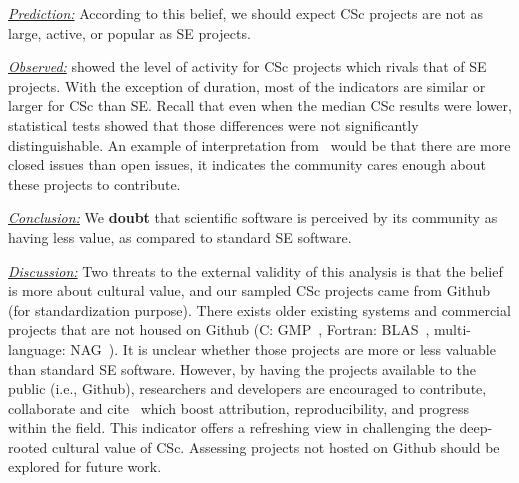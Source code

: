 \documentclass[conference,10pt]{IEEEtran}
\newenvironment{RQ}{\vspace{1mm}\begin{tcolorbox}[enhanced,width=3.4in,size=fbox,colback=red!5!white,drop shadow southeast,sharp corners]}{\end{tcolorbox}}
\begin{document}
\noindent \textit{\underline{Prediction:}} 
According to this belief, we should expect CSc projects are not as large, active, or popular as SE projects.

\noindent \textit{\underline{Observed:}} 
 showed the
level of activity for CSc projects which rivals that of SE projects.
With the exception of duration, most of the indicators are similar or larger for CSc than SE. Recall that even when the median CSc results were lower, statistical tests showed that those differences were not significantly distinguishable. 
An example of interpretation from~ would be that there are more closed issues than open issues, it indicates the community cares enough about these projects to contribute.

\begin{RQ}
\textit{\underline{Conclusion:}} 
We \textbf{doubt} that scientific software is perceived by its community as having less value, as compared to standard SE software.
\end{RQ}

\noindent \textit{\underline{Discussion:}}
Two threats to the external validity of this analysis is that the belief is more about cultural value,
and our sampled CSc projects came from Github (for standardization purpose). There exists older existing systems and commercial projects that are not housed on Github (C: GMP~\cite{gmp}, Fortran: BLAS~\cite{blas}, multi-language: NAG~\cite{nag}). It is unclear whether those projects are more or less valuable than standard SE software. However, by having 
the projects available to the public (i.e., Github), researchers and developers are encouraged to contribute, collaborate and cite~\cite{Borges_github, borges_github_star} which boost attribution,  reproducibility, and progress within the field. This indicator offers a refreshing view in challenging the deep-rooted cultural value of CSc. Assessing projects not hosted on Github should be explored for future work. \\
\end{document}
